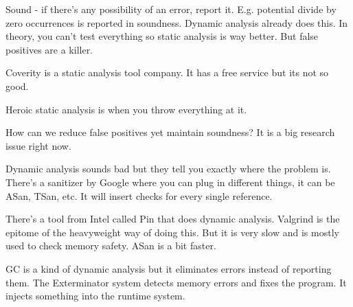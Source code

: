 \documentclass[twoside]{article}
\begin{document}
Sound - if there’s any possibility of an error, report it. E.g. potential divide by zero occurrences is reported in soundness. Dynamic analysis already does this. In theory, you can’t test everything so static analysis is way better. But false positives are a killer. 

Coverity is a static analysis tool company. It has a free service but its not so good. 

Heroic static analysis is when you throw everything at it. 

How can we reduce false positives yet maintain soundness? It is a big research issue right now.  

Dynamic analysis sounds bad but they tell you exactly where the problem is. There’s a sanitizer by Google where you can plug in different things, it can be ASan, TSan, etc. It will insert checks for every single reference. 

There’s a tool from Intel called Pin that does dynamic analysis. Valgrind is the epitome of the heavyweight way of doing this. But it is very slow and is mostly used to check memory safety. ASan is a bit faster. 

GC is a kind of dynamic analysis but it eliminates errors instead of reporting them. The Exterminator system detects memory errors and fixes the program. It injects something into the runtime system. 




\end{document}
